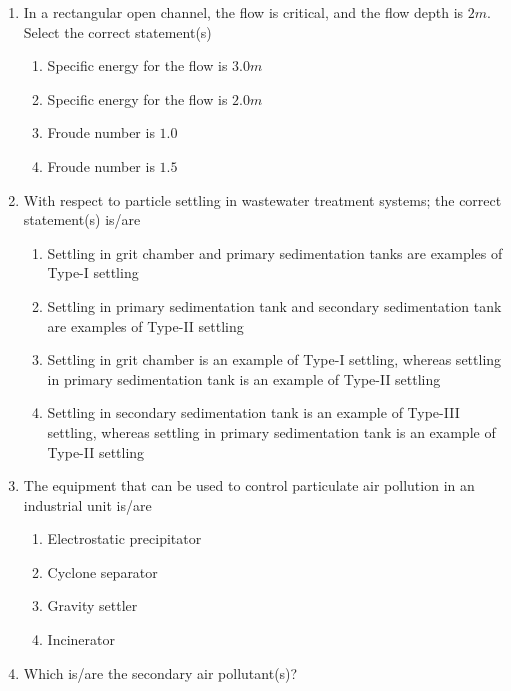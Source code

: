 \documentclass[journal]{IEEEtran}
\begin{document}
\begin{enumerate}
\item In a rectangular open channel, the flow is critical, and the flow depth is $2m$. Select the correct statement(s) \hfill{}

\begin{enumerate}
\item Specific energy for the flow is $3.0m$
\item Specific energy for the flow is $2.0m$
\item Froude number is $1.0$
\item Froude number is $1.5$
\end{enumerate}

\item With respect to particle settling in wastewater treatment systems; the correct statement(s) is/are \hfill{}

\begin{enumerate}
\item Settling in grit chamber and primary sedimentation tanks are examples of Type-I settling
\item Settling in primary sedimentation tank and secondary sedimentation tank are examples of Type-II settling
\item Settling in grit chamber is an example of Type-I settling, whereas settling in primary sedimentation tank is an example of Type-II settling
\item Settling in secondary sedimentation tank is an example of Type-III settling, whereas settling in primary sedimentation tank is an example of Type-II settling
\end{enumerate}

\item The equipment that can be used to control particulate air pollution in an industrial unit is/are \hfill{}

\begin{multicols}{2}
\begin{enumerate}
\item Electrostatic precipitator
\item Cyclone separator
\item Gravity settler
\item Incinerator
\end{enumerate}
\end{multicols}

\item Which is/are the secondary air pollutant(s)? \hfill{}


\end{enumerate}
\end{document}
